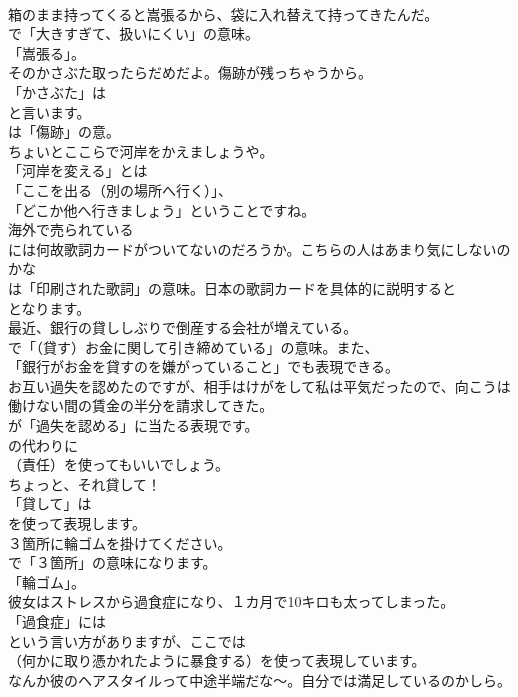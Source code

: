 \documentclass[8pt]{extreport}
\begin{document}
\begin{CJK}{UTF8}{min}
\\	箱のまま持ってくると嵩張るから、袋に入れ替えて持ってきたんだ。 
\\	で「大きすぎて、扱いにくい」の意味。
\\	「嵩張る」。	
\\	そのかさぶた取ったらだめだよ。傷跡が残っちゃうから。 
\\	「かさぶた」は 
\\	と言います。
\\	は「傷跡」の意。	
\\	ちょいとここらで河岸をかえましょうや。 
\\	「河岸を変える」とは
\\	「ここを出る（別の場所へ行く）」、
\\	「どこか他へ行きましょう」ということですね。	
\\	海外で売られている
\\	には何故歌詞カードがついてないのだろうか。こちらの人はあまり気にしないのかな 
\\	は「印刷された歌詞」の意味。日本の歌詞カードを具体的に説明すると 
\\	となります。	
\\	最近、銀行の貸ししぶりで倒産する会社が増えている。 
\\	で「（貸す）お金に関して引き締めている」の意味。また、
\\	「銀行がお金を貸すのを嫌がっていること」でも表現できる。	
\\	お互い過失を認めたのですが、相手はけがをして私は平気だったので、向こうは働けない間の賃金の半分を請求してきた。 
\\	が「過失を認める」に当たる表現です。
\\	の代わりに 
\\	（責任）を使ってもいいでしょう。	
\\	ちょっと、それ貸して！ 
\\	「貸して」は
\\	を使って表現します。	
\\	３箇所に輪ゴムを掛けてください。 
\\	で「３箇所」の意味になります。
\\	「輪ゴム」。	
\\	彼女はストレスから過食症になり、１カ月で10キロも太ってしまった。 
\\	「過食症」には
\\	という言い方がありますが、ここでは
\\	（何かに取り憑かれたように暴食する）を使って表現しています。	
\\	なんか彼のヘアスタイルって中途半端だな～。自分では満足しているのかしら。 

\end{CJK}
\end{document}
